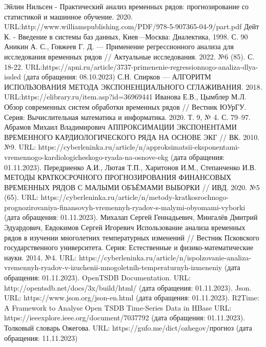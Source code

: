 \documentclass[a4paper,14pt, unknownkeysallowed]{extreport}
\begin{document}
	\addto{}
	\begin{thebibliography}{}
		  Эйлин Нильсен - Практический анализ временных рядов: прогнозирование со статистикой и машинное обучение. 2020. URL:http://www.williamspublishing.com/PDF/978-5-907365-04-9/part.pdf
		 Дейт К. - Введение в системы баз данных, Киев—Москва: Диалектика, 1998. С. 90
		  Аникин А. С., Говжеев Г. Д.  ---  Применение регрессионного анализа для исследования временных рядов // Актуальные исследования. 2022. №6 (85). С. 18-22. URL:https://apni.ru/article/3737-primenenie-regressionnogo-analiza-dlya-issled (дата обращения: 08.10.2023)
		  С.Н. Спирков ---  АЛГОРИТМ ИСПОЛЬЗОВАНИЯ МЕТОДА
		ЭКСПОНЕНЦИАЛЬНОГО СГЛАЖИВАНИЯ. 2018. URL:https://elibrary.ru/item.asp?id=36969441
		 Иванова Е.В., Цымблер М.Л. Обзор современных систем обработки временных рядов //
		Вестник ЮУрГУ. Серия: Вычислительная математика и информатика. 2020. Т. 9, № 4.
		С. 79–97.
		 Абрамов Михаил Владимирович АППРОКСИМАЦИИ ЭКСПОНЕНТАМИ ВРЕМЕННОГО КАРДИОЛОГИЧЕСКОГО РЯДА НА ОСНОВЕ ЭКГ // ВК. 2010. №9. URL: https://cyberleninka.ru/article/n/approksimatsii-eksponentami-vremennogo-kardiologicheskogo-ryada-na-osnove-ekg (дата обращения: 01.11.2023).
		 Передриенко А.И., Лютая Т.П., Харитонов И.М., Степанченко И.В. МЕТОДЫ КРАТКОСРОЧНОГО ПРОГНОЗИРОВАНИЯ ФИНАНСОВЫХ ВРЕМЕННЫХ РЯДОВ С МАЛЫМИ ОБЪЁМАМИ ВЫБОРКИ // ИВД. 2020. №5 (65). URL: https://cyberleninka.ru/article/n/metody-kratkosrochnogo-prognozirovaniya-finansovyh-vremennyh-ryadov-s-malymi-obyomami-vyborki (дата обращения: 01.11.2023).
		 Михалап Сергей Геннадьевич, Мингалёв Дмитрий Эдуардович, Евдокимов Сергей Игоревич Использование анализа временных рядов в изучении многолетних температурных изменений // Вестник Псковского государственного университета. Серия: Естественные и физико-математические науки. 2014. №4. URL: https://cyberleninka.ru/article/n/ispolzovanie-analiza-vremennyh-ryadov-v-izuchenii-mnogoletnih-temperaturnyh-izmeneniy (дата обращения: 01.11.2023).
		 OpenTSDB Documentation. URL: http://opentsdb.net/docs/3x/build/html/ (дата обращения: 01.11.2023).
		 Json. URL: https://www.json.org/json-en.html (дата обращения: 01.11.2023).
		 R2Time: A Framework to Analyse Open TSDB Time-Series Data in HBase URL: https://ieeexplore.ieee.org/document/7037792 (дата обращения: 01.11.2023).
		 Толковый словарь Ожегова. URL: https://gufo.me/dict/ozhegov/прогноз (дата обращения: 11.11.2023)
	\end{thebibliography}
	
\end{document}
